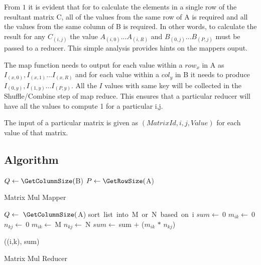 \documentclass{article}
\begin{document}
From \(1\) it is evident that for to calculate the elements in a single row of the resultant matrix C, all of the values from the same row of A is required and all the values from the same column of B is required. In other words, to calculate the result for any ${C_{(i,j)}}$ the value ${A_{(i,0)} ...  A_{(i,R)}}$ and ${B_{(0,j)} ... B_{(P,j)}}$  must be passed to a reducer. This simple analysis provides hints on the mappers ouput.

The map function needs to output for each value within a ${row_{x}}$ in A as ${I_{(x, 0)}, I_{(x, 1)} …  I_{(x,R)}}$ and for each value within a ${col_{y}}$ in B it needs to produce ${I_{(0, y)}, I_{(1, y)} …  I_{(P,y)}}$. All the ${I}$ values with same key will be  collected in the Shuffle/Combine step of map reduce. This ensures that a particular reducer will have all the values to compute 1 for a particular i,j.

The input of a particular matrix is given as ${(MatrixId,i,j,Value)}$ for each value of that matrix.

\subsection{Algorithm}
\IncMargin{1em}
\begin{algorithm}[H]
\DontPrintSemicolon
{}
\BlankLine
$Q\leftarrow \GetColumnSize($B)\;
$P\leftarrow \GetRowSize($A)\;
\caption{Matrix Mul Mapper\label{IR}}
\end{algorithm}
\DecMargin{1em}

\IncMargin{1em}
\begin{algorithm}[H]
\DontPrintSemicolon
{}
\BlankLine
$Q\leftarrow\ \GetColumnSize($A)\;
sort\ list\ into\ M\ or\ N\ based\ on\ i\;
$sum\leftarrow\ $0\;
 {
	$m_{ik}\leftarrow\ $0\;
	$n_{kj}\leftarrow\ $0\;
	 {
		$m_{ik}\leftarrow\ $M\big[K\big]
	}
	 {
		$n_{kj}\leftarrow\ $N\big[K\big]
	}
	$sum\leftarrow\ $sum $+$ ($m_{ik}$ $*$ $n_{kj}$)
}

\emit((i,k), sum)

\caption{Matrix Mul Reducer\label{IR}}
\end{algorithm}
\DecMargin{1em}
\end{document}
